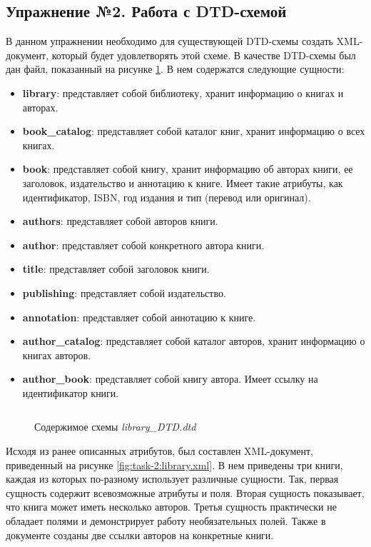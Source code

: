 \documentclass[a4paper, 14pt]{extarticle}
\begin{document}
\subsection*{Упражнение №2. Работа с DTD-схемой}

В данном упражнении необходимо для существующей DTD-схемы создать XML-документ,
который будет удовлетворять этой схеме. В качестве DTD-схемы был дан файл,
показанный на рисунке \ref{fig:task-2:library_DTD.dtd}. В нем содержатся
следующие сущности:
\begin{itemize}
  \item \textbf{library}: представляет собой библиотеку, хранит информацию о
  книгах и авторах.
  \item \textbf{book\_catalog}: представляет собой каталог книг, хранит
  информацию о всех книгах.
  \item \textbf{book}: представляет собой книгу, хранит информацию об авторах
  книги, ее заголовок, издательство и аннотацию к книге. Имеет такие атрибуты,
  как идентификатор, ISBN, год издания и тип (перевод или оригинал).
  \item \textbf{authors}: представляет собой авторов книги.
  \item \textbf{author}: представляет собой конкретного автора книги.
  \item \textbf{title}: представляет собой заголовок книги.
  \item \textbf{publishing}: представляет собой издательство.
  \item \textbf{annotation}: представляет собой аннотацию к книге.
  \item \textbf{author\_catalog}: представляет собой каталог авторов, хранит
  информацию о книгах авторов.
  \item \textbf{author\_book}: представляет собой книгу автора. Имеет ссылку на
  идентификатор книги.
\end{itemize}

\begin{figure}[H]
  \centering
  \inputminted{dtd}{../code/task-2/library_DTD.dtd}
  \caption{Содержимое схемы \textit{library\_DTD.dtd}}
  \label{fig:task-2:library_DTD.dtd}
\end{figure}

Исходя из ранее описанных атрибутов, был составлен XML-документ, приведенный на
рисунке \ref{fig:task-2:library.xml}. В нем приведены три книги, каждая из
которых по-разному использует различные сущности. Так, первая сущность содержит
всевозможные атрибуты и поля. Вторая сущность показывает, что книга может иметь
несколько авторов. Третья сущность практически не обладает полями и
демонстрирует работу необязательных полей. Также в документе созданы две ссылки
авторов на конкретные книги.
\end{document}
